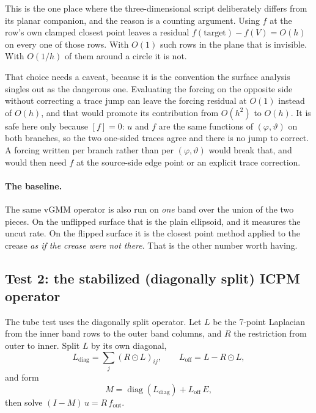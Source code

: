 This is the one place where the three-dimensional script deliberately
differs from its planar companion, and the reason is a counting argument.
Using $f$ at the row's own clamped closest point leaves a residual
$f(\text{target}) - f(V) = O(h)$ on every one of those rows. With $O(1)$
such rows in the plane that is invisible. With $O(1/h)$ of them around a
circle it is not.

That choice needs a caveat, because it is the convention the surface
analysis singles out as the dangerous one. Evaluating the forcing on the
opposite side without correcting a trace jump can leave the forcing
residual at $O(1)$ instead of $O(h)$, and that would promote its
contribution from $O(h^2)$ to $O(h)$. It is safe here only because
$[f]=0$: $u$ and $f$ are the same functions of $(\varphi,\vartheta)$ on
both branches, so the two one-sided traces agree and there is no jump to
correct. A forcing written per branch rather than per
$(\varphi,\vartheta)$ would break that, and would then need $f$ at the
source-side edge point or an explicit trace correction.

\paragraph{The baseline.} The same vGMM operator is also run on
\emph{one} band over the union of the two pieces. On the unflipped
surface that is the plain ellipsoid, and it measures the uncut rate. On
the flipped surface it is the closest point method applied to the crease
\emph{as if the crease were not there}. That is the other number worth
having.

\subsection{Test 2: the stabilized (diagonally split) ICPM operator}

The tube test uses the diagonally split operator. Let $L$ be the 7-point
Laplacian from the inner band rows to the outer band columns, and $R$ the
restriction from outer to inner. Split $L$ by its own diagonal,
\begin{equation}
  L_{\mathrm{diag}} = \textstyle\sum_j (R\odot L)_{ij}, \qquad
  L_{\mathrm{off}} = L - R\odot L ,
\end{equation}
and form
\begin{equation}
  M = \operatorname{diag}(L_{\mathrm{diag}})
      + L_{\mathrm{off}}\,E ,
  \label{eq:icpm}
\end{equation}
then solve $(I-M)\,u = R\,f_{\mathrm{out}}$.

